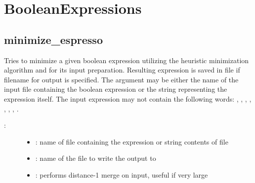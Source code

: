 \documentclass[letterpaper,10pt,english]{sphinxmanual}
\begin{document}
\section{BooleanExpressions}
\label{\detokenize{BooleanExpressions:id1}}\label{\detokenize{BooleanExpressions::doc}}\label{\detokenize{BooleanExpressions:booleanexpressions}}

\subsection{minimize\_espresso}
\label{\detokenize{BooleanExpressions:minimize-espresso}}\label{\detokenize{BooleanExpressions:id2}}

\begin{fulllineitems}
\label{\detokenize{BooleanExpressions:PyBoolNet.BooleanExpressions.minimize_espresso}}
Tries to minimize a given boolean expression utilizing the heuristic minimization algorithm
 and  for its input preparation. Resulting expression is saved
in file if filename for output is specified. The argument  may be either the name
of the input file containing the boolean expression or the string representing the expression
itself. The input expression may not contain the following words: , , ,
, , , , .
\begin{description}
\item[{:}] \leavevmode\begin{itemize}
\item {} 
: name of file containing the expression or string contents of file

\item {} 
: name of the file to write the output to

\item {} 
: performs distance-1 merge on input, useful if very large


\end{itemize}
\end{description}
\end{fulllineitems}
\end{document}
